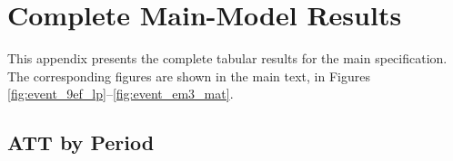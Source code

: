 \section{Complete Main-Model Results} \label{ap:principal}

This appendix presents the complete tabular results for the main specification. The corresponding figures are shown in the main text, in Figures \ref{fig:event_9ef_lp}--\ref{fig:event_em3_mat}.

\subsection{ATT by Period}






